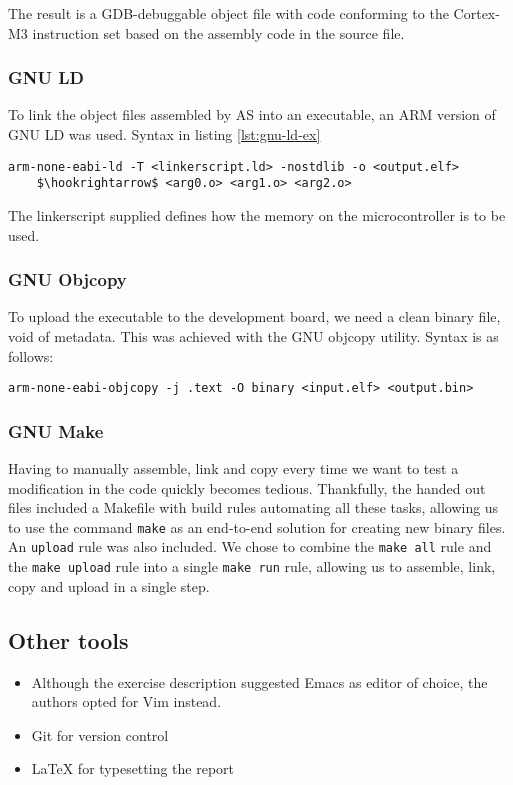The result is a GDB-debuggable object file with code conforming to the Cortex-M3 instruction set based on the assembly code in the source file.

\subsubsection{GNU LD}

To link the object files assembled by AS into an executable, an ARM version of GNU LD was used. Syntax in listing \ref{lst:gnu-ld-ex}

\begin{lstlisting}[label=lst:gnu-ld-ex,caption=Linker usage, mathescape]
arm-none-eabi-ld -T <linkerscript.ld> -nostdlib -o <output.elf>
    $\hookrightarrow$ <arg0.o> <arg1.o> <arg2.o>
\end{lstlisting}

The linkerscript supplied defines how the memory on the microcontroller is to be used.

\subsubsection{GNU Objcopy}

To upload the executable to the development board, we need a clean binary file, void of metadata. This was achieved with the GNU objcopy utility. Syntax is as follows:

\begin{lstlisting}[label=lst:gnu-objcopy-ex,caption=Objcopy usage]
arm-none-eabi-objcopy -j .text -O binary <input.elf> <output.bin>
\end{lstlisting}


\subsubsection{GNU Make}

Having to manually assemble, link and copy every time we want to test a modification in the code quickly becomes tedious. Thankfully, the handed out files included a Makefile with build rules automating all these tasks, allowing us to use the command \texttt{make} as an end-to-end solution for creating new binary files. An \texttt{upload} rule was also included. We chose to combine the \texttt{make all} rule and the \texttt{make upload} rule into a single \texttt{make run} rule, allowing us to assemble, link, copy and upload in a single step.

\subsection{Other tools}

\begin{itemize}
\item Although the exercise description suggested Emacs as editor of choice, the authors opted for Vim instead.
\item Git for version control
\item \LaTeX{} for typesetting the report
\end{itemize}
